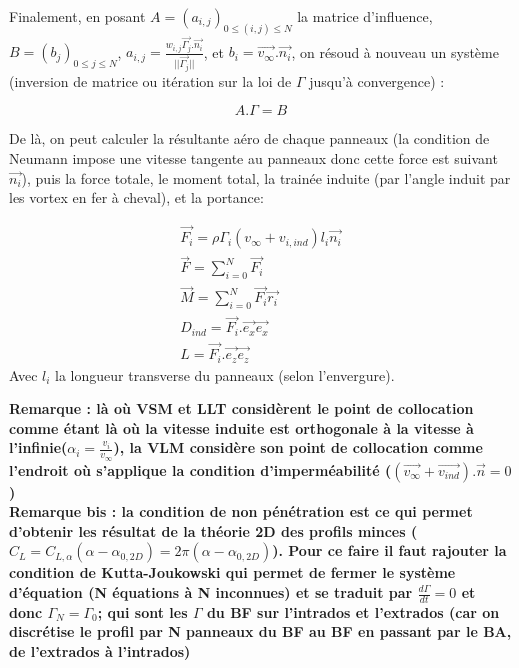 Finalement, en posant $A = (a_{i,j})_{0 \leq (i,j) \leq N}$ la matrice d'influence, $B = (b_{j})_{0 \leq j \leq N}$, $a_{i,j} = \frac{w_{i,j}\overrightarrow{\Gamma_j}.\overrightarrow{n_i}}{||\overrightarrow{\Gamma_j}||}$, et $b_{i} = \overrightarrow{v_{\infty}}.\overrightarrow{n_i}$, on résoud à nouveau un système (inversion de matrice ou itération sur la loi de $\Gamma$ jusqu'à convergence) :

\begin{equation}
    A.\Gamma = B
    \label{eq : vlm gamma}
\end{equation}

De là, on peut calculer la résultante aéro de chaque panneaux (la condition de Neumann impose une vitesse tangente au panneaux donc cette force est suivant $\overrightarrow{n_i}$), puis la force totale, le moment total, la trainée induite (par l'angle induit par les vortex en fer à cheval), et la portance: 

\begin{equation}
    \begin{split}
        \overrightarrow{F_i} = \rho \Gamma_i(v_{\infty} + v_{i,ind})l_i \overrightarrow{n_i} \\
        \overrightarrow{F} = \sum_{i=0}^{N}\overrightarrow{F_i} \\
        \overrightarrow{M} = \sum_{i=0}^{N}\overrightarrow{F_i} \overrightarrow{r_i} \\
        D_{ind} = \overrightarrow{F_i}.\overrightarrow{e_x} \overrightarrow{e_x} \\
        L = \overrightarrow{F_i}.\overrightarrow{e_z} \overrightarrow{e_z}
    \end{split}
    \label{eq : vlm resultats}
\end{equation}
Avec $l_i$ la longueur transverse du panneaux (selon l'envergure).

\textbf{Remarque : là où VSM et LLT considèrent le point de collocation comme étant là où la vitesse induite est orthogonale à la vitesse à l'infinie($\alpha_i = \frac{v_i}{v_{\infty}}$), la VLM considère son point de collocation comme l'endroit où s'applique la condition d'imperméabilité ($(\overrightarrow{v_{\infty}} + \overrightarrow{v_{ind}}).\overrightarrow{n} = 0$)}\\

\textbf{Remarque bis : la condition de non pénétration est ce qui permet d'obtenir les résultat de la théorie 2D des profils minces ($C_L = C_{L, \alpha}(\alpha - \alpha_{0,2D}) = 2\pi (\alpha - \alpha_{0,2D})$). Pour ce faire il faut rajouter la condition de Kutta-Joukowski qui permet de fermer le système d'équation (N équations à N inconnues) et se traduit par $\frac{d\Gamma}{dt} = 0$ et donc $\Gamma_N = \Gamma_0$; qui sont les $\Gamma$ du BF sur l'intrados et l'extrados (car on discrétise le profil par N panneaux du BF au BF en passant par le BA, de l'extrados à l'intrados)}\\

